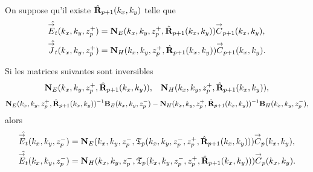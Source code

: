     \begin{prop}%
      \label{prop:plan:transfert:reflexion}{}~

      On suppose qu'il existe \(\hat{\mathbf{R}}_{p+1}(k_x,k_y)\) telle que 
      \begin{align*}
        \hat{{\overset{\rightarrow}{E}}_t}(k_x,k_y,z_p^+) &= \mathbf{N}_{E}(k_x,k_y,z_p^+,\hat{\mathbf{R}}_{p+1}(k_x,k_y)){\overset{\rightarrow}{C}}_{p+1}(k_x,k_y),
        \\
        \hat{{\overset{\rightarrow}{J}}_t}(k_x,k_y,z_p^+) &= \mathbf{N}_{H}(k_x,k_y,z_p^+,\hat{\mathbf{R}}_{p+1}(k_x,k_y)){\overset{\rightarrow}{C}}_{p+1}(k_x,k_y).
      \end{align*}

      Si les matrices suivantes sont inversibles
      \begin{align*}
        \mathbf{N}_{E}(k_x,k_y,z_p^+,\hat{\mathbf{R}}_{p+1}(k_x,k_y)), && \mathbf{N}_{H}(k_x,k_y,z_p^+,\hat{\mathbf{R}}_{p+1}(k_x,k_y)),
      \end{align*}
      \begin{align*}
        \mathbf{N}_{E}(k_x,k_y,z_p^+,\hat{\mathbf{R}}_{p+1}(k_x,k_y))^{-1}\mathbf{B}_{E}(k_x,k_y,z_p^-) - \mathbf{N}_{H}(k_x,k_y,z_p^+,\hat{\mathbf{R}}_{p+1}(k_x,k_y))^{-1}\mathbf{B}_{H}(k_x,k_y,z_p^-),
      \end{align*}
      alors
      \begin{align*}
        \hat{{\overset{\rightarrow}{E}}_t}(k_x,k_y,z_p^-) &= \mathbf{N}_{E}(k_x,k_y,z_p^-,\mathfrak{T}_p(k_x,k_y,z_p^-,z_p^+,\hat{\mathbf{R}}_{p+1}(k_x,k_y))){\overset{\rightarrow}{C}}_{p}(k_x,k_y),
        \\
        \hat{{\overset{\rightarrow}{E}}_t}(k_x,k_y,z_p^-) &= \mathbf{N}_{H}(k_x,k_y,z_p^-,\mathfrak{T}_p(k_x,k_y,z_p^-,z_p^+,\hat{\mathbf{R}}_{p+1}(k_x,k_y))){\overset{\rightarrow}{C}}_{p}(k_x,k_y).
      \end{align*}
    \end{prop}

